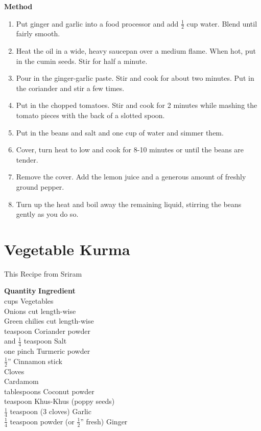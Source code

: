 {\bf Method}
\begin{enumerate}
   \item  Put  ginger  and garlic into a food processor and add $\frac{1}{2}$ cup water.
      Blend until fairly smooth.
   \item Heat the oil in a wide, heavy saucepan over a medium  flame.    When
      hot, put in the cumin seeds.  Stir for half a minute.
   \item Pour  in  the  ginger-garlic  paste.    Stir  and cook for about two
      minutes.  Put in the coriander and stir a few times.
   \item Put in the chopped tomatoes.  Stir and cook for  2  minutes while mashing
      the tomato pieces with the back of a slotted spoon.
   \item Put in the beans and salt and one cup of water and simmer them.
   \item Cover,  turn heat  to low and cook for 8-10 minutes or until the
      beans are tender.
   \item Remove the cover.  Add the lemon juice  and  a  generous  amount  of
      freshly ground pepper.
   \item Turn  up  the  heat and boil away the remaining liquid, stirring the
      beans gently as you do so.
\end{enumerate}

\section{Vegetable Kurma}
  This Recipe from Sriram

\begin{tabbing}
\hspace{1.0cm}  \={\bf Quantity}   \hspace{3.0cm} \={\bf Ingredient}\\
  cups   \>Vegetables\\
   \>Onions  cut length-wise\\
   \>Green chilies cut length-wise\\
 teaspoon   \>Coriander powder \\
 and $\frac{1}{4}$ teaspoon   \>Salt \\
 \>one pinch   \>Turmeric powder\\
\>$\frac{1}{2}$''   \>Cinnamon stick\\
   \>Cloves \\
   \>Cardamom \\
 tablespoons   \>Coconut powder \\
 teaspoon   \>Khus-Khus (poppy seeds) \\
\>$\frac{1}{4}$ teaspoon (3 cloves)   \>Garlic \\
\>$\frac{1}{4}$ teaspoon powder (or $\frac{1}{2}$'' fresh)   \>Ginger \\
\end{tabbing}


